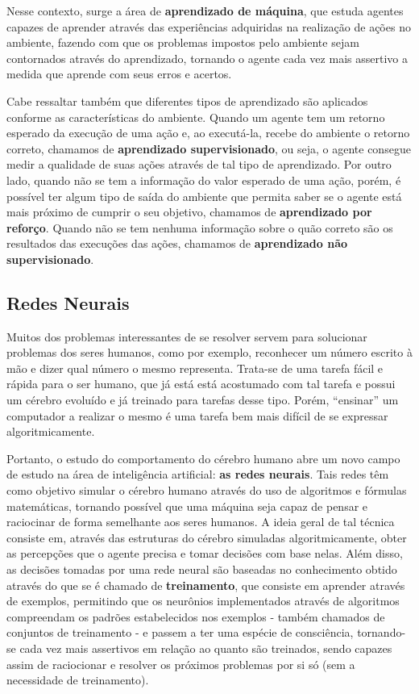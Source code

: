 Nesse contexto, surge a área de \textbf{aprendizado de máquina}, que estuda
agentes capazes de aprender através das experiências adquiridas na realização de
ações no ambiente, fazendo com que os problemas impostos pelo ambiente sejam
contornados através do aprendizado, tornando o agente cada vez mais assertivo a
medida que aprende com seus erros e acertos.

Cabe ressaltar também que diferentes tipos de aprendizado são aplicados conforme
as características do ambiente. Quando um agente tem um retorno esperado da
execução de uma ação e, ao executá-la, recebe do ambiente o retorno correto,
chamamos de \textbf{aprendizado supervisionado}, ou seja, o agente consegue
medir a qualidade de suas ações através de tal tipo de aprendizado. Por outro
lado, quando não se tem a informação do valor esperado de uma ação, porém, é
possível ter algum tipo de saída do ambiente que permita saber se o agente está
mais próximo de cumprir o seu objetivo, chamamos de \textbf{aprendizado por
reforço}. Quando não se tem nenhuma informação sobre o quão correto são os
resultados das execuções das ações, chamamos de \textbf{aprendizado não
supervisionado}. \cite{Russell:1995:AIM:193191}

\subsection{Redes Neurais}

Muitos dos problemas interessantes de se resolver servem para solucionar
problemas dos seres humanos, como por exemplo, reconhecer um número escrito à
mão e dizer qual número o mesmo representa. Trata-se de uma tarefa fácil e
rápida para o ser humano, que já está está acostumado com tal tarefa e possui
um cérebro evoluído e já treinado para tarefas desse tipo. Porém, ``ensinar'' um
computador a realizar o mesmo é uma tarefa bem mais difícil de se expressar
algoritmicamente.

Portanto, o estudo do comportamento do cérebro humano abre um novo campo de
estudo na área de inteligência artificial: \textbf{as redes neurais}. Tais redes
têm como objetivo simular o cérebro humano através do uso de algoritmos e
fórmulas matemáticas, tornando possível que uma máquina seja capaz de pensar e
raciocinar de forma semelhante aos seres humanos. A ideia geral de tal técnica
consiste em, através das estruturas do cérebro simuladas algoritmicamente,
obter as percepções que o agente precisa e tomar decisões com base nelas. Além
disso, as decisões tomadas por uma rede neural são baseadas no conhecimento
obtido através do que se é chamado de \textbf{treinamento}, que consiste em
aprender através de exemplos, permitindo que os neurônios implementados
através de algoritmos compreendam os padrões estabelecidos nos exemplos -
também chamados de conjuntos de treinamento - e passem a ter uma espécie de
consciência, tornando-se cada vez mais assertivos em relação ao quanto são
treinados, sendo capazes assim de raciocionar e resolver os próximos problemas
por si só (sem a necessidade de treinamento).

